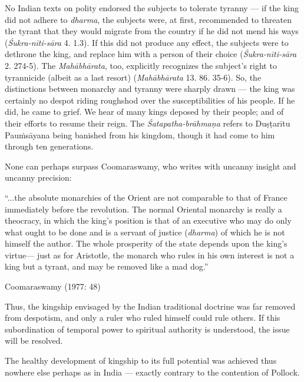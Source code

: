 No Indian texts on polity endorsed the subjects to tolerate tyranny --- if the king did not adhere to {\sl dharma}, the subjects were, at first, recommended to threaten the tyrant that they would migrate from the country if he did not mend his ways ({\sl Śukra-nīti-sāra} 4. 1.3). If this did not produce any effect, the subjects were to dethrone the king, and replace him with a person of their choice ({\sl Śukra-nīti-sāra} 2. 274-5). The {\sl Mahābhārata}, too, explicitly recognizes the subject’s right to tyrannicide (albeit as a last resort) ({\sl Mahābhārata} 13. 86. 35-6). So, the distinctions between monarchy and tyranny were sharply drawn --- the king was certainly no despot riding roughshod over the susceptibilities of his people. If he did, he came to grief. We hear of many kings deposed by their people; and of their efforts to resume their reign.  The {\sl Śatapatha-brāhmaṇa} refers to Duṣṭarītu Pauṁsāyana being banished from his kingdom, though it had come to him through ten generations. 

None can perhaps surpass Coomaraswamy, who writes with uncanny insight and uncanny precision: 

\begin{myquote}
“...the absolute monarchies of the Orient are not comparable to that of France immediately before the revolution. The normal Oriental monarchy is really a theocracy, in which the king’s position is that of an executive who may do only what ought to be done and is a servant of justice ({\sl dharma}) of which he is not himself the author. The whole prosperity of the state depends upon the king’s virtue--- just as for Aristotle, the monarch who rules in his own interest is not a king but a tyrant, and may be removed like a mad dog.”

\hfill Coomaraswamy (1977: 48)
\end{myquote}

Thus, the kingship envisaged by the Indian traditional doctrine was far removed from despotism, and only a ruler who ruled himself could rule others.  If this subordination of temporal power to spiritual authority is understood, the issue will be resolved.  

The healthy development of kingship to its full potential was achieved thus nowhere else perhaps as in India --- exactly contrary to the contention of Pollock.

\newpage

\theendnotes
